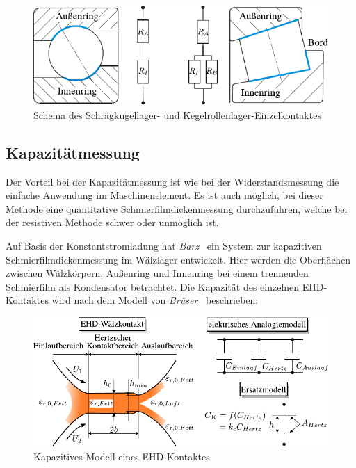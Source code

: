 \begin{figure}[htb]
    \centering
    \includegraphics[]{./images/schema_schraegrikula_kerola_kuhlmann.pdf}
    \caption{Schema des Schrägkugellager- und Kegelrollenlager-Einzelkontaktes~\cite{kuhlmann_2009}}
    \label{fig:schema_schraerikula_kerola_kuhlmann}
\end{figure}

\subsection{Kapazitätmessung}
\label{sub:kapazitatmessung}

Der Vorteil bei der Kapazitätmessung ist wie bei der Widerstandsmessung die einfache Anwendung im Maschinenelement.
Es ist auch möglich, bei dieser Methode eine quantitative Schmierfilmdickenmessung durchzuführen, welche bei der resistiven Methode schwer oder unmöglich ist.

Auf Basis der Konstantstromladung hat \textit{Barz}~\cite{barz_1996} ein System zur kapazitiven Schmierfilmdickenmessung im Wälzlager entwickelt.
Hier werden die Oberflächen zwischen Wälzkörpern, Außenring und Innenring bei einem trennenden Schmierfilm als Kondensator betrachtet.
Die Kapazität des einzelnen EHD-Kontaktes wird nach dem Modell von \textit{Brüser}~\cite{brueser_1972} beschrieben:

\begin{figure}[htb]
    \centering
    \includegraphics[]{./images/kapazitaet_schmierfilmdicke_modell.pdf}
    \caption{Kapazitives Modell eines EHD-Kontaktes~\cite{barz_1996}}
    \label{fig:kapazitives_modell_eines_ehd_kontaktes}
\end{figure}

